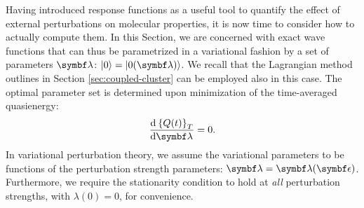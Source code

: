 Having introduced response functions as a useful tool to quantify the
effect of external perturbations on molecular properties, it is now time
to consider how to actually compute them.
In this Section, we are concerned with exact wave functions that can
thus be parametrized in a variational fashion by a set of parameters
$\vect{\lambda}$: $\ket{0}=\ket{0(\vect{\lambda})}$.
We recall that the Lagrangian method outlines in Section
\ref{sec:coupled-cluster} can be employed also in this
case.\autocite{Christiansen1998-pe, Helgaker2012-cz, Pawlowski2015-sq}
The optimal parameter set is determined upon minimization of the
time-averaged quasienergy:
\begin{equation}\label{eq:var-cond}
 \deriv{\aveQ}{\vect{\lambda}} = 0.
\end{equation}
In variational perturbation theory,\autocite{Helgaker1992-ph,
Saue2002-ns} we assume the variational parameters to be functions of the
perturbation strength parameters: $\vect{\lambda} =
\vect{\lambda}(\vect{\epsilon})$.
Furthermore, we require the stationarity condition to hold at \emph{all}
perturbation strengths, with $\lambda(0) = 0$, for convenience.

